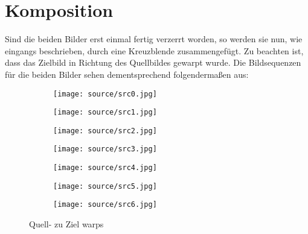 \chapter{Komposition}

Sind die beiden Bilder erst einmal fertig verzerrt worden, so werden
sie nun, wie eingangs beschrieben, durch eine Kreuzblende 
zusammengefügt. Zu beachten ist, dass das Zielbild
in Richtung des Quellbildes gewarpt wurde. Die Bildsequenzen
für die beiden Bilder sehen dementsprechend folgenderma\ss en
aus:

\begin{figure}[htbp]
	\centering


	
	\begin{subfigure}[b]{0.19\textwidth}
		\centering
		\texttt{[image: source/src0.jpg]} %
		\caption{}
	\end{subfigure}
		\begin{subfigure}[b]{0.19\textwidth}
		\centering
		\texttt{[image: source/src1.jpg]} %
		\caption{}
	\end{subfigure}
		\begin{subfigure}[b]{0.19\textwidth}
		\centering
		\texttt{[image: source/src2.jpg]} %
		\caption{}
	\end{subfigure}
		\begin{subfigure}[b]{0.19\textwidth}
		\centering
		\texttt{[image: source/src3.jpg]} %
		\caption{}
	\end{subfigure}
		\begin{subfigure}[b]{0.19\textwidth}
		\centering
		\texttt{[image: source/src4.jpg]} %
		\caption{}
	\end{subfigure}
		\begin{subfigure}[b]{0.19\textwidth}
		\centering
		\texttt{[image: source/src5.jpg]} %
		\caption{}
	\end{subfigure}
			\begin{subfigure}[b]{0.19\textwidth}
		\centering
		\texttt{[image: source/src6.jpg]} %
		\caption{}
	\end{subfigure}
	

	
		\caption{Quell- zu Ziel warps}
	\label{fig:sources}
	\end{figure}
	
